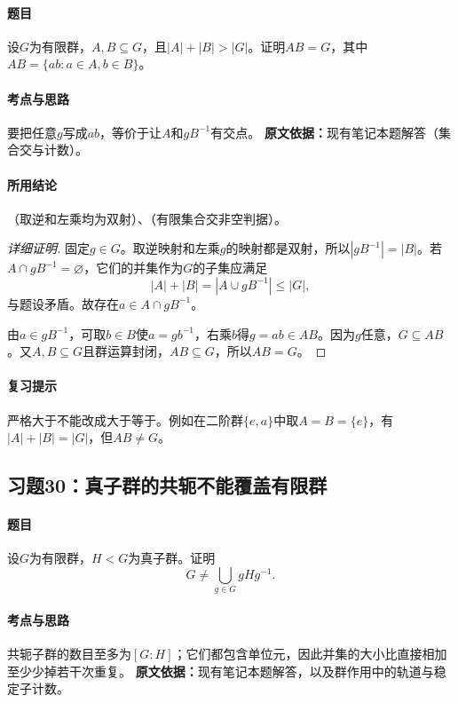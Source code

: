 \paragraph{题目}设$G$为有限群，$A,B\subseteq G$，且$|A|+|B|>|G|$。证明$AB=G$，其中$AB=\{ab:a\in A,b\in B\}$。
\paragraph{考点与思路}要把任意$g$写成$ab$，等价于让$A$和$gB^{-1}$有交点。
\textbf{原文依据：}现有笔记本题解答（集合交与计数）。
\paragraph{所用结论}（取逆和左乘均为双射）、（有限集合交非空判据）。
\begin{proof}[详细证明]
固定$g\in G$。取逆映射和左乘$g$的映射都是双射，所以$|gB^{-1}|=|B|$。若$A\cap gB^{-1}=\varnothing$，它们的并集作为$G$的子集应满足
\[
|A|+|B|=|A\cup gB^{-1}|\le|G|,
\]
与题设矛盾。故存在$a\in A\cap gB^{-1}$。

由$a\in gB^{-1}$，可取$b\in B$使$a=gb^{-1}$，右乘$b$得$g=ab\in AB$。因为$g$任意，$G\subseteq AB$。又$A,B\subseteq G$且群运算封闭，$AB\subseteq G$，所以$AB=G$。
\end{proof}
\paragraph{复习提示}严格大于不能改成大于等于。例如在二阶群$\{e,a\}$中取$A=B=\{e\}$，有$|A|+|B|=|G|$，但$AB\ne G$。

\subsection{习题30：真子群的共轭不能覆盖有限群}
\paragraph{题目}设$G$为有限群，$H<G$为真子群。证明
\[
G\ne\bigcup_{g\in G}gHg^{-1}.
\]
\paragraph{考点与思路}共轭子群的数目至多为$[G:H]$；它们都包含单位元，因此并集的大小比直接相加至少少掉若干次重复。
\textbf{原文依据：}现有笔记本题解答，以及群作用中的轨道与稳定子计数。
